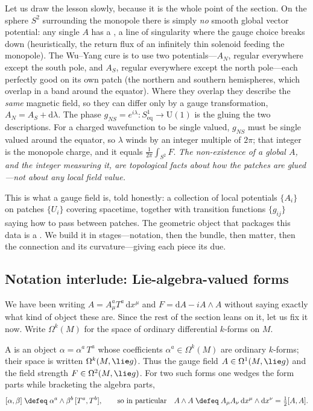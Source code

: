 \documentclass[11pt]{article}
\newcommand{\dd}{\mathrm{d}}                 %
\newcommand{\Uone}{\mathrm{U}(1)}
\begin{document}
Let us draw the lesson slowly, because it is the whole point of the section. On the sphere
$S^2$ surrounding the monopole there is simply \emph{no} smooth global vector potential:
any single $A$ has a , a line of singularity where the gauge choice
breaks down (heuristically, the return flux of an infinitely thin solenoid feeding the
monopole). The Wu--Yang cure is to use two potentials---$A_N$, regular everywhere except
the south pole, and $A_S$, regular everywhere except the north pole---each perfectly good
on its own patch (the northern and southern hemispheres, which overlap in a band around
the equator). Where they overlap they describe the \emph{same} magnetic field, so they can
differ only by a gauge transformation, $A_N=A_S+\dd\lambda$. The phase
$g_{NS}=e^{i\lambda}:S^1_{\text{eq}}\to\Uone$ is the  gluing
the two descriptions. For a charged wavefunction to be single valued, $g_{NS}$ must be
single valued around the equator, so $\lambda$ winds by an integer multiple of $2\pi$;
that integer is the monopole charge, and it equals $\frac{1}{2\pi}\int_{S^2}F$. \emph{The
non-existence of a global $A$, and the integer measuring it, are topological facts about
how the patches are glued---not about any local field value.}

This is what a gauge field is, told honestly: a collection of local potentials $\{A_i\}$
on patches $\{U_i\}$ covering spacetime, together with transition functions $\{g_{ij}\}$
saying how to pass between patches. The geometric object that packages this data is a
. We build it in stages---notation, then the
bundle, then matter, then the connection and its curvature---giving each piece its due.

\subsection{Notation interlude: Lie-algebra-valued forms}
\label{sec:liealgforms}

We have been writing $A=A_\mu^a T^a\,\dd x^\mu$ and $F=\dd A-iA\wedge A$ without saying
exactly what kind of object these are. Since the rest of the section leans on it, let us
fix it now. Write $\Omega^k(M)$ for the space of ordinary differential $k$-forms on $M$.

\begin{ddefinition}
A  is an object $\alpha=\alpha^a\,T^a$ whose coefficients
$\alpha^a\in\Omega^k(M)$ are ordinary $k$-forms; their space is written
$\Omega^k(M,\lie g)$. Thus the gauge field $A\in\Omega^1(M,\lie g)$ and the field strength
$F\in\Omega^2(M,\lie g)$. For two such forms one wedges the form parts while bracketing the
algebra parts,
\[
[\alpha,\beta]\;\defeq\;\alpha^a\wedge\beta^b\,[T^a,T^b],
\qquad\text{so in particular}\quad
A\wedge A\;\defeq\;A_\mu A_\nu\,\dd x^\mu\wedge\dd x^\nu=\tfrac12[A,A].
\]
\end{ddefinition}
\end{document}
